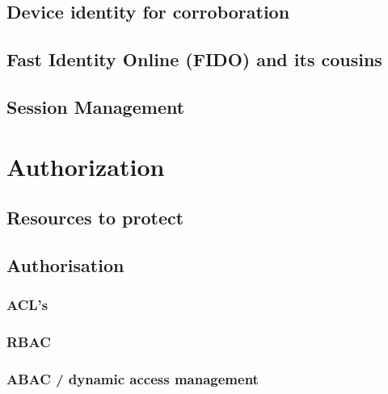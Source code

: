 \hypertarget{device-identity-for-corroboration}{%
\subsection{Device identity for
corroboration}\label{device-identity-for-corroboration}}

\hypertarget{fast-identity-online-fido-and-its-cousins}{%
\subsection{Fast Identity Online (FIDO) and its
cousins}\label{fast-identity-online-fido-and-its-cousins}}

\hypertarget{session-management}{%
\subsection{Session Management}\label{session-management}}

\hypertarget{authorization}{%
\section{Authorization}\label{authorization}}

\hypertarget{resources-to-protect}{%
\subsection{Resources to protect}\label{resources-to-protect}}

\hypertarget{authorisation}{%
\subsection{Authorisation}\label{authorisation}}

\hypertarget{acls}{%
\subsubsection{ACL's}\label{acls}}

\hypertarget{rbac}{%
\subsubsection{RBAC}\label{rbac}}

\hypertarget{abac-dynamic-access-management}{%
\subsubsection{ABAC / dynamic access
management}\label{abac-dynamic-access-management}}

